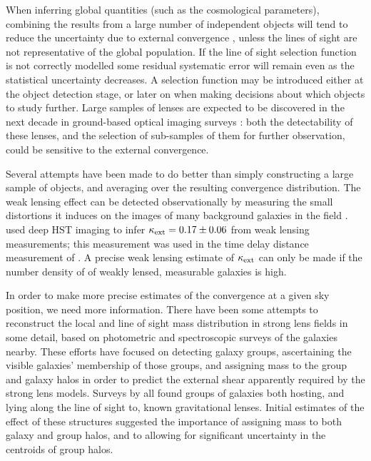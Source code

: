 \documentclass[useAMS,usenatbib]{mn2e}
\begin{document}
When inferring global quantities
(such as the cosmological parameters), combining the results from a
large number of independent objects will tend to reduce the uncertainty
due to external convergence \citep[\eg][]{Holz+Linder2005}, unless the lines of sight are not representative of the global population. If the line of sight selection function is not correctly modelled some residual systematic error will
remain even as the statistical uncertainty decreases. A selection function may be introduced either at the object
detection stage, or later on when making decisions about which objects
to study further. Large samples
of lenses are expected to be discovered in the next decade in
ground-based optical imaging surveys \citep{Oguri+Marshall2010}: both
the detectability of these lenses,  and the selection of sub-samples of
them for further observation, could be sensitive to the external
convergence. 

Several attempts have been made to do better than simply constructing a
large sample of objects, and averaging over the resulting convergence
distribution. The weak lensing effect can be detected observationally 
by measuring the
small distortions it induces on the images of many background galaxies
in the field \citep[see e.g.][for a review]{Schneider2006}. 
\citet{NakajimaEtal2009} used deep HST imaging to infer $\kappa_{\rm ext}=0.17\pm0.06$ from weak lensing measurements; this measurement was used in the time delay distance
measurement of \citet{FadelyEtal2009}. A precise weak lensing estimate of $\kappa_{\rm ext}$ can only be made if the number density of of weakly lensed, measurable galaxies is high.

In order to make more precise estimates of the convergence at a given
sky position, we need more information.   There have been some attempts
to reconstruct the local and line of sight mass distribution in strong
lens fields in some detail, based on photometric and spectroscopic
surveys of the galaxies nearby. These efforts have focused on  detecting
galaxy groups, ascertaining the visible galaxies' membership of those
groups, and assigning mass to the group and galaxy halos in order to
predict the external shear apparently required by the strong lens
models. Surveys by
\citet{Fassnacht+Lubin2002,AugerEtal2007,WilliamsEtal2006,MomchevaEtal2006}
all found groups of galaxies both hosting, and lying  along the line of
sight to, known gravitational lenses. Initial estimates of the effect of
these structures suggested the importance of assigning mass to both
galaxy and group halos, and to allowing for significant uncertainty in
the centroids of group halos. 
\end{document}
